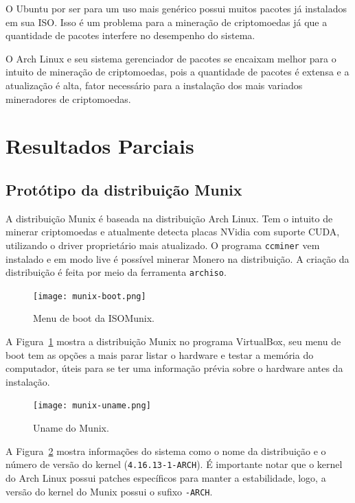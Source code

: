 \documentclass[
article,			%
12pt,				%
openright,			%
oneside,			%
a4paper,			%
chapter=TITLE,		%
section=TITLE,		%
subsection=TITLE,	%
subsubsection=TITLE,%
subsubsubsection=TITLE, %
english,			%
brazil,				%
]{abntex2}
\def\code#1{\texttt{#1}}
\begin{document}
O Ubuntu por ser para um uso mais genérico possui muitos pacotes já
instalados em sua ISO\@. Isso é um problema para a mineração de
criptomoedas já que a quantidade de pacotes interfere no desempenho do
sistema. 

O Arch Linux e seu sistema gerenciador de pacotes se encaixam melhor
para o intuito de mineração de criptomoedas, pois a quantidade de
pacotes é extensa e a atualização é alta, fator necessário para a
instalação dos mais variados mineradores de criptomoedas.

\section{Resultados Parciais}

\subsection{Protótipo da distribuição Munix}

A distribuição Munix é baseada na distribuição Arch Linux. Tem o
intuito de minerar criptomoedas e atualmente detecta placas NVidia com
suporte CUDA\@, utilizando o driver proprietário mais atualizado. O
programa \code{ccminer} vem instalado e em modo live é possível
minerar Monero na distribuição. A criação da distribuição é feita por
meio da ferramenta \code{archiso}.

\begin{figure}[H]
    \caption{\label{fig:boot-munix}Menu de boot da ISO\@ Munix.}
    \begin{center}
        \texttt{[image: munix-boot.png]}
    \end{center}
\end{figure}

A Figura~\ref{fig:boot-munix} mostra a distribuição Munix no programa
VirtualBox, seu menu de boot tem as opções a mais parar listar o
hardware e testar a memória do computador, úteis para se ter uma
informação prévia sobre o hardware antes da instalação.

\begin{figure}[H]
    \caption{\label{fig:uname-munix}Uname do Munix.}
    \begin{center}
        \texttt{[image: munix-uname.png]}
    \end{center}
\end{figure}

A Figura~\ref{fig:uname-munix} mostra informações do sistema como o
nome da distribuição e o número de versão do kernel
(\code{4.16.13-1-ARCH}). É importante notar que o kernel do Arch Linux
possui patches específicos para manter a estabilidade, logo, a versão
do kernel do Munix possui o sufixo \code{-ARCH}.


\pagebreak 
\end{document}

